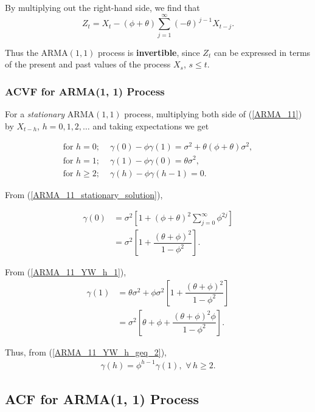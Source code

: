 \documentclass[11pt, a4paper]{article}
\numberwithin{equation}{section}
\theoremstyle{definition}
\begin{document}
By multiplying out the right-hand side, we find that
\begin{equation}
Z_t = X_t - (\phi + \theta)\sum \limits_{j=1}^{\infty} (-\theta)^{\,j-1} X_{t-j}.
\end{equation}

Thus the ARMA$(1,1)$ process is \textbf{invertible}, since $Z_t$ can be expressed in terms of the present and past values of the process $X_s$, $s \leq t$.

\subsubsection{ACVF for ARMA(1, 1) Process}

For a \textit{stationary} ARMA$(1, 1)$ process, multiplying both side of (\ref{ARMA_11}) by $X_{t-h}$, $h = 0, 1, 2, \ldots$ and taking expectations we get

\begin{align}
\text{for } h = 0; \,\, &\gamma(0) - \phi \gamma(1) = \sigma^2 + \theta (\phi + \theta) \sigma^2, \\[0.2em]
\text{for } h = 1; \,\, &\gamma(1) - \phi \gamma(0) = \theta \sigma^2, \label{ARMA_11_YW_h_1}\\[0.2em]
\text{for } h \geq 2; \,\, &\gamma(h) - \phi \gamma(h-1) = 0. \label{ARMA_11_YW_h_geq_2}
\end{align}

From (\ref{ARMA_11_stationary_solution}),

\begin{align*}
\gamma(0) &= \sigma^2 \left[ 1 + (\phi + \theta)^2 \sum \limits_{j = 0}^{\infty} \phi^{2j} \right] \\[0.35em]
&= \sigma^2 \left[ 1 + \dfrac{(\theta + \phi)^2}{1 - \phi^2} \right].
\end{align*}

From (\ref{ARMA_11_YW_h_1}),
\begin{align*}
\gamma(1) &= \theta \sigma^2 + \phi \sigma^2 \left[ 1 + \dfrac{(\theta + \phi)^2}{1 - \phi^2} \right] \\[0.35em]
&= \sigma^2 \left[ \theta + \phi + \dfrac{(\theta + \phi)^2\phi}{1 - \phi^2} \right].
\end{align*}

Thus, from (\ref{ARMA_11_YW_h_geq_2}),
\begin{align*}
\gamma(h) = \phi^{h-1} \gamma(1), \,\, \forall \, h \geq 2.
\end{align*}

\subsection{ACF for ARMA(1, 1) Process}
\end{document}
